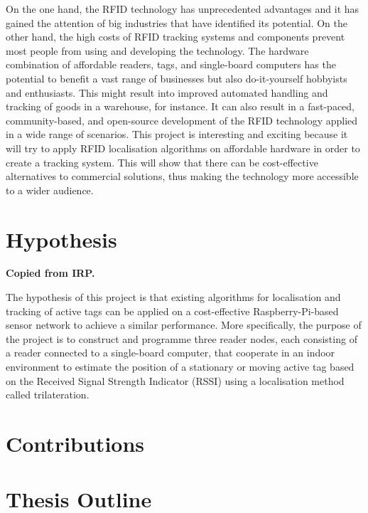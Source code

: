 On the one hand, the RFID technology has unprecedented advantages and it has gained the attention of big industries that have identified its potential. On the other hand, the high costs of RFID tracking systems and components prevent most people from using and developing the technology. The hardware combination of affordable readers, tags, and single-board computers has the potential to benefit a vast range of businesses but also do-it-yourself hobbyists and enthusiasts. This might result into improved automated handling and tracking of goods in a warehouse, for instance. It can also result in a fast-paced, community-based, and open-source development of the RFID technology applied in a wide range of scenarios. This  project is interesting and exciting because it will try to apply RFID localisation algorithms on affordable hardware in order to create a tracking system. This will show that there can be cost-effective alternatives to commercial solutions, thus making the technology more accessible to a wider audience.

\section{Hypothesis}

\textbf{Copied from IRP.}

The hypothesis of this project is that existing algorithms for localisation and tracking of active tags can be applied on a cost-effective Raspberry-Pi-based sensor network to achieve a similar performance. More specifically, the purpose of the project is to construct and programme three reader nodes, each consisting of a reader connected to a single-board computer, that cooperate in an indoor environment to estimate the position of a stationary or moving active tag based on the Received Signal Strength Indicator (RSSI) using a localisation method called trilateration.

\section{Contributions}

\section{Thesis Outline}


